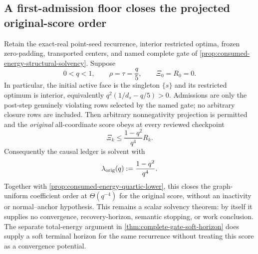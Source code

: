 \subsection{A first-admission floor closes the projected original-score order}
\label{sec:original-score-projected-quartic}

\begin{theorem}
\label{thm:original-score-projected-quartic}
Retain the exact-real point-seed recurrence, interior restricted optima,
frozen zero-padding, transported centers, and named complete gate of
\cref{prop:consumed-energy-structural-solvency}.  Suppose
\begin{equation*}
 0<q<1,
 \qquad \rho=\tau=\frac q5,
 \qquad \Xi_0=R_0=0.
\end{equation*}
In particular, the initial active face is the singleton $\{s\}$ and its
restricted optimum is interior, equivalently
$q^2(1/d_s-q/5)>0$.  Admissions are only the post-step genuinely violating
rows selected by the named gate; no arbitrary closure rows are included.
Then arbitrary nonnegativity projection is permitted and the \emph{original}
all-coordinate score obeys at every reviewed checkpoint
\begin{equation}
 \Xi_k\leq \frac{1-q^2}{q^4}R_k.
 \label{eq:original-score-projected-quartic}
\end{equation}
Consequently the causal ledger is solvent with
\begin{equation*}
 \lambda_{\rm orig}(q):=\frac{1-q^2}{q^4}.
\end{equation*}
Together with \cref{prop:consumed-energy-quartic-lower}, this closes the
graph-uniform coefficient order at $\Theta(q^{-4})$ for the original score,
without an inactivity or normal--anchor hypothesis.  This remains a scalar
solvency theorem: by itself it supplies no convergence, recovery-horizon,
semantic stopping, or work conclusion.  The separate total-energy argument
in \cref{thm:complete-gate-soft-horizon} does supply a soft terminal horizon
for the same recurrence without treating this score as a convergence
potential.
\end{theorem}

